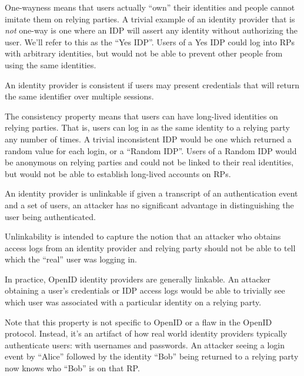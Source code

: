 \documentclass{llncs}
\begin{document}
One-wayness means that users actually ``own'' their identities and
people cannot imitate them on relying parties. A trivial example of an
identity provider that is \textit{not} one-way is one where an IDP
will assert any identity without authorizing the user.  We'll refer to
this as the ``Yes IDP''. Users of a Yes IDP could log into RPs with
arbitrary identities, but would not be able to prevent other people
from using the same identities.

\begin{definition}[Consistency]
\label{def:consistency}
An identity provider is consistent if users may present credentials
that will return the same identifier over multiple sessions.
\end{definition}

The consistency property means that users can have long-lived
identities on relying parties. That is, users can log in as the same
identity to a relying party any number of times. A trivial
inconsistent IDP would be one which returned a random value for each
login, or a ``Random IDP''. Users of a Random IDP would be anonymous
on relying parties and could not be linked to their real identities,
but would not be able to establish long-lived accounts on RPs.

\begin{definition}[Unlinkability]
\label{def:unlinkability}
An identity provider is unlinkable if given a transcript of an
authentication event and a set of users, an attacker has no
significant advantage in distinguishing the user being authenticated.
\end{definition}

Unlinkability is intended to capture the notion that an attacker who
obtains access logs from an identity provider and relying party should
not be able to tell which the ``real'' user was logging in.

In practice, OpenID identity providers are generally linkable. An
attacker obtaining a user's credentials or IDP access logs would be
able to trivially see which user was associated with a particular
identity on a relying party.

Note that this property is not specific to OpenID or a flaw in the
OpenID protocol. Instead, it's an artifact of how real world identity
providers typically authenticate users: with usernames and
passwords. An attacker seeing a login event by ``Alice'' followed by
the identity ``Bob'' being returned to a relying party now knows who
``Bob'' is on that RP.
\end{document}

